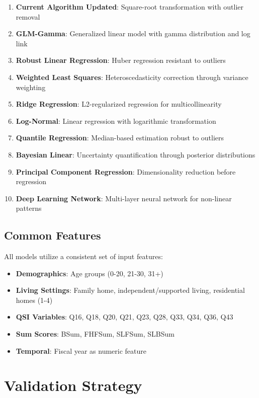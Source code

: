 \begin{enumerate}
    \item \textbf{Current Algorithm Updated}: Square-root transformation with outlier removal
    \item \textbf{GLM-Gamma}: Generalized linear model with gamma distribution and log link
    \item \textbf{Robust Linear Regression}: Huber regression resistant to outliers
    \item \textbf{Weighted Least Squares}: Heteroscedasticity correction through variance weighting
    \item \textbf{Ridge Regression}: L2-regularized regression for multicollinearity
    \item \textbf{Log-Normal}: Linear regression with logarithmic transformation
    \item \textbf{Quantile Regression}: Median-based estimation robust to outliers
    \item \textbf{Bayesian Linear}: Uncertainty quantification through posterior distributions
    \item \textbf{Principal Component Regression}: Dimensionality reduction before regression
    \item \textbf{Deep Learning Network}: Multi-layer neural network for non-linear patterns
\end{enumerate}

\subsection{Common Features}

All models utilize a consistent set of input features:
\begin{itemize}
    \item \textbf{Demographics}: Age groups (0-20, 21-30, 31+)
    \item \textbf{Living Settings}: Family home, independent/supported living, residential homes (1-4)
    \item \textbf{QSI Variables}: Q16, Q18, Q20, Q21, Q23, Q28, Q33, Q34, Q36, Q43
    \item \textbf{Sum Scores}: BSum, FHFSum, SLFSum, SLBSum
    \item \textbf{Temporal}: Fiscal year as numeric feature
\end{itemize}

\section{Validation Strategy}

